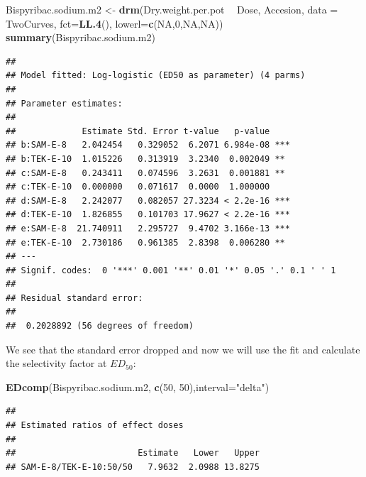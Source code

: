 \documentclass[letterpaper,]{book}
\newenvironment{Shaded}{\begin{snugshade}}{\end{snugshade}}
\newcommand{\DataTypeTok}[1]{\textcolor[rgb]{0.13,0.29,0.53}{#1}}
\newcommand{\DecValTok}[1]{\textcolor[rgb]{0.00,0.00,0.81}{#1}}
\newcommand{\KeywordTok}[1]{\textcolor[rgb]{0.13,0.29,0.53}{\textbf{#1}}}
\newcommand{\NormalTok}[1]{#1}
\newcommand{\OperatorTok}[1]{\textcolor[rgb]{0.81,0.36,0.00}{\textbf{#1}}}
\newcommand{\OtherTok}[1]{\textcolor[rgb]{0.56,0.35,0.01}{#1}}
\newcommand{\StringTok}[1]{\textcolor[rgb]{0.31,0.60,0.02}{#1}}
\begin{document}
\begin{Shaded}
\begin{Highlighting}[]
\NormalTok{Bispyribac.sodium.m2 <-}\StringTok{ }\KeywordTok{drm}\NormalTok{(Dry.weight.per.pot }\OperatorTok{~}\StringTok{ }\NormalTok{Dose, Accesion,}
                            \DataTypeTok{data =}\NormalTok{ TwoCurves, }\DataTypeTok{fct=}\KeywordTok{LL.4}\NormalTok{(),}
                            \DataTypeTok{lowerl=}\KeywordTok{c}\NormalTok{(}\OtherTok{NA}\NormalTok{,}\DecValTok{0}\NormalTok{,}\OtherTok{NA}\NormalTok{,}\OtherTok{NA}\NormalTok{))}
\KeywordTok{summary}\NormalTok{(Bispyribac.sodium.m2)}
\end{Highlighting}
\end{Shaded}

\begin{verbatim}
## 
## Model fitted: Log-logistic (ED50 as parameter) (4 parms)
## 
## Parameter estimates:
## 
##             Estimate Std. Error t-value   p-value    
## b:SAM-E-8   2.042454   0.329052  6.2071 6.984e-08 ***
## b:TEK-E-10  1.015226   0.313919  3.2340  0.002049 ** 
## c:SAM-E-8   0.243411   0.074596  3.2631  0.001881 ** 
## c:TEK-E-10  0.000000   0.071617  0.0000  1.000000    
## d:SAM-E-8   2.242077   0.082057 27.3234 < 2.2e-16 ***
## d:TEK-E-10  1.826855   0.101703 17.9627 < 2.2e-16 ***
## e:SAM-E-8  21.740911   2.295727  9.4702 3.166e-13 ***
## e:TEK-E-10  2.730186   0.961385  2.8398  0.006280 ** 
## ---
## Signif. codes:  0 '***' 0.001 '**' 0.01 '*' 0.05 '.' 0.1 ' ' 1
## 
## Residual standard error:
## 
##  0.2028892 (56 degrees of freedom)
\end{verbatim}

We see that the standard error dropped and now we will use the fit and calculate the selectivity factor at \(ED_{50}\):

\begin{Shaded}
\begin{Highlighting}[]
\KeywordTok{EDcomp}\NormalTok{(Bispyribac.sodium.m2, }\KeywordTok{c}\NormalTok{(}\DecValTok{50}\NormalTok{, }\DecValTok{50}\NormalTok{),}\DataTypeTok{interval=}\StringTok{"delta"}\NormalTok{)}
\end{Highlighting}
\end{Shaded}

\begin{verbatim}
## 
## Estimated ratios of effect doses
## 
##                        Estimate   Lower   Upper
## SAM-E-8/TEK-E-10:50/50   7.9632  2.0988 13.8275
\end{verbatim}
\end{document}

